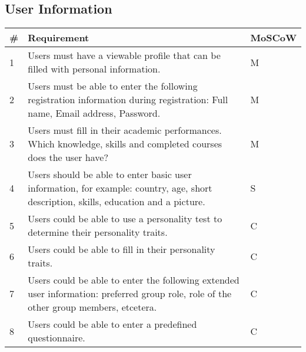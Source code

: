 \subsection{User Information}
\begin{tabular}{ | p{0.5cm} | p{12cm} | p{2cm} | }
\hline
\textbf{\#} & \textbf{Requirement} & \textbf{MoSCoW} \\ \hline
1 & Users must have a viewable profile that can be filled with personal information. & M \\ \hline
2 & Users must be able to enter the following registration information during registration: Full name, Email address, Password. & M \\ \hline
3 & Users must fill in their academic performances. Which knowledge, skills and completed courses does the user have? & M \\ \hline
4 & Users should be able to enter basic user information, for example: country, age, short description, skills, education and a picture. & S \\ \hline
5 & Users could be able to use a personality test to determine their personality traits. & C \\ \hline
6 & Users could be able to fill in their personality traits. & C \\ \hline
7 & Users could be able to enter the following extended user information: preferred group role, role of the other group members, etcetera. & C \\ \hline
8 & Users could be able to enter a predefined questionnaire. & C \\
\hline
\end{tabular}

